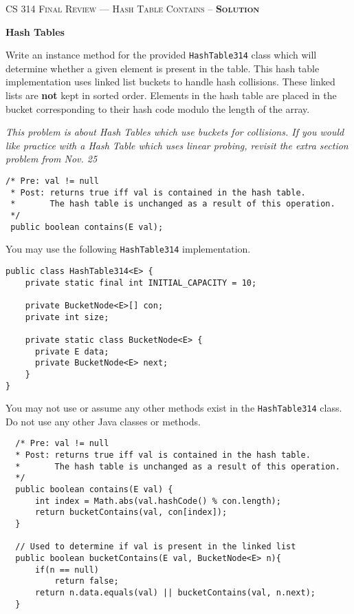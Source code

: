 \documentclass[12pt,letter]{article}
\begin{document}
\noindent\textsc{\large CS 314 Final Review --- Hash Table Contains -- \textbf{Solution}}

\vspace{6pt}
\noindent\textbf{Hash Tables}

\vspace{2pt}
\noindent Write an instance method for the provided \texttt{HashTable314} class which will determine whether a given element is present in the table.
This hash table implementation uses linked list buckets to handle hash collisions. These linked lists are \textbf{not} kept in sorted order.
Elements in the hash table are placed in the bucket corresponding to their hash code modulo the length of the array.

\vspace{4pt}
\noindent \emph{This problem is about Hash Tables which use buckets for collisions. If you would like practice with a Hash Table which uses linear probing, 
revisit the extra section problem from Nov. 25}

\vspace{4pt}

\begin{verbatim}
/* Pre: val != null
 * Post: returns true iff val is contained in the hash table.
 *       The hash table is unchanged as a result of this operation.
 */
 public boolean contains(E val);
\end{verbatim}

\vspace{6pt}
\noindent You may use the following \texttt{HashTable314} implementation.
\begin{verbatim}
public class HashTable314<E> {
    private static final int INITIAL_CAPACITY = 10;

    private BucketNode<E>[] con;
    private int size;

    private static class BucketNode<E> {
      private E data;
      private BucketNode<E> next;
    }
}
\end{verbatim}

\noindent You may not use or assume any other methods exist in the \texttt{HashTable314} class.
\noindent Do not use any other Java classes or methods.

\clearpage
\begin{verbatim}
  /* Pre: val != null
  * Post: returns true iff val is contained in the hash table.
  *       The hash table is unchanged as a result of this operation.
  */
  public boolean contains(E val) {
      int index = Math.abs(val.hashCode() % con.length);
      return bucketContains(val, con[index]);
  }

  // Used to determine if val is present in the linked list
  public boolean bucketContains(E val, BucketNode<E> n){
      if(n == null)
          return false;
      return n.data.equals(val) || bucketContains(val, n.next);
  }
\end{verbatim}
\end{document}
